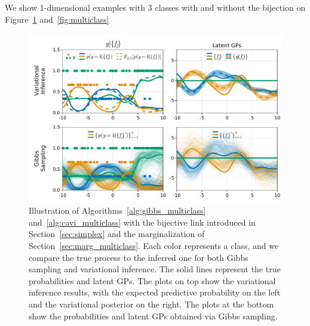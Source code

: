 We show 1-dimensional examples with 3 classes with and without the bijection on Figure~\ref{fig:bijective_multiclass} and~\ref{fig:multiclass}

\begin{figure}
    \centering
    \includegraphics[width=\textwidth]{./chapters/8_discussions/figures/categorical_bijective.pdf}
    \caption{Illustration of Algorithms~\ref{alg:gibbs_multiclass} and~\ref{alg:cavi_multiclass} with the bijective link introduced in Section~\ref{sec:simplex} and the marginalization of Section~\ref{sec:marg_multiclass}.
    Each color represents a class, and we compare the true process to the inferred one for both Gibbs sampling and variational inference.
    The solid lines represent the true probabilities and latent \ac{GPs}.
    The plots on top show the variational inference results, with the expected predictive probability on the left and the variational posterior on the right.
    The plots at the bottom show the probabilities and latent GPs obtained via Gibbs sampling.}
    \label{fig:bijective_multiclass}
\end{figure}
